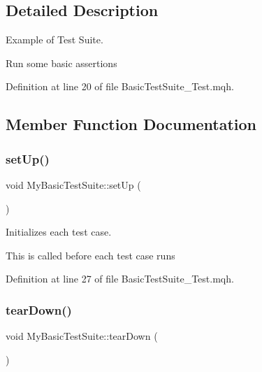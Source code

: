 \subsection{Detailed Description}
Example of Test Suite. 

Run some basic assertions 

Definition at line 20 of file Basic\+Test\+Suite\+\_\+\+Test.\+mqh.



\subsection{Member Function Documentation}
\mbox{\label{class_my_basic_test_suite_a78580af3199c6d14278446ba5c67b741}} 
\subsubsection{\texorpdfstring{set\+Up()}{setUp()}}
{\footnotesize\ttfamily void My\+Basic\+Test\+Suite\+::set\+Up (\begin{DoxyParamCaption}{ }\end{DoxyParamCaption})\hspace{0.3cm}{\ttfamily [inline]}}



Initializes each test case. 

This is called before each test case runs 

Definition at line 27 of file Basic\+Test\+Suite\+\_\+\+Test.\+mqh.

\mbox{\label{class_my_basic_test_suite_a83b6bce47ffac97d43b8e2d14cbd48aa}} 
\subsubsection{\texorpdfstring{tear\+Down()}{tearDown()}}
{\footnotesize\ttfamily void My\+Basic\+Test\+Suite\+::tear\+Down (\begin{DoxyParamCaption}{ }\end{DoxyParamCaption})\hspace{0.3cm}{\ttfamily [inline]}}



